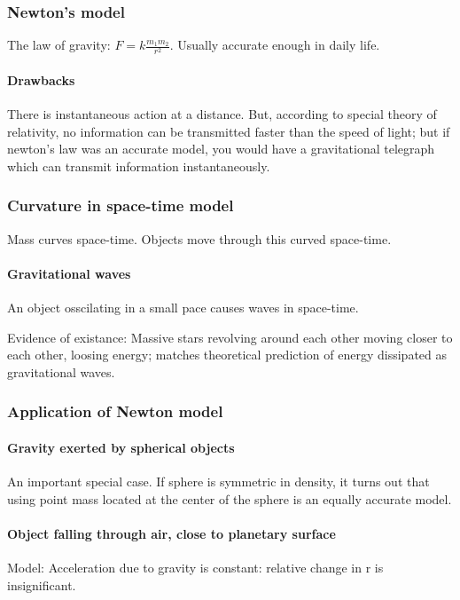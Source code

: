 \documentclass{article}
\begin{document}
\subsubsection{Newton's model}
The law of gravity: $F = k \frac{m_{1}m_{2}}{r^{2}}$. Usually accurate enough in daily life.

\paragraph*{Drawbacks}
There is instantaneous action at a distance. But, according to special theory of relativity, no information can be transmitted faster than the speed of light; but if newton's law was an accurate model, you would have a gravitational telegraph which can transmit information instantaneously.

\subsubsection{Curvature in space-time model}
Mass curves space-time. Objects move through this curved space-time.

\paragraph*{Gravitational waves}
An object osscilating in a small pace causes waves in space-time.

Evidence of existance: Massive stars revolving around each other moving closer to each other, loosing energy; matches theoretical prediction of energy dissipated as gravitational waves.

\subsubsection{Application of Newton model}
\paragraph*{Gravity exerted by spherical objects}
An important special case. If sphere is symmetric in density, it turns out that using point mass located at the center of the sphere is an equally accurate model.

\paragraph*{Object falling through air, close to planetary surface}
Model: Acceleration due to gravity is constant: relative change in r is insignificant.
\end{document}
